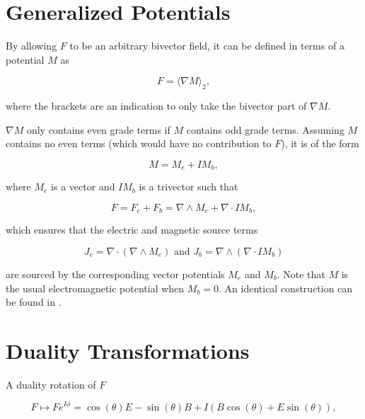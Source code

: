 \documentclass{article}
\begin{document}
  \section{Generalized Potentials}

  By allowing $F$ to be an arbitrary bivector field, it can be defined in terms of a potential $M$ as

  \begin{equation}
    F = \langle \nabla M \rangle_2,
  \end{equation}

  where the brackets are an indication to only take the bivector part of $\nabla M$.

  $\nabla M$ only contains even grade terms if $M$ contains odd grade terms. Assuming $M$ contains no even terms (which would have no contribution to $F$), it is of the form

  \begin{equation}
    M = M_e + I M_b, \label{eq:potential}
  \end{equation}

   where $M_e$ is a vector and $I M_b$ is a trivector such that

  \begin{equation}
    F = F_e + F_b = \nabla \wedge M_e + \nabla \cdot I M_b,
  \end{equation}

  which ensures that the electric and magnetic source terms 

  \begin{equation}
    J_e = \nabla \cdot (\nabla \wedge M_e) \text{ and } J_b = \nabla \wedge (\nabla \cdot I M_b)
  \end{equation} 

  are sourced by the corresponding vector potentials $M_e$ and $M_b$. Note that $M$ is the usual electromagnetic potential when $M_b = 0$. An identical construction can be found in \cite{dressel}.

  \section{Duality Transformations}

  A duality rotation of $F$

  \begin{equation}
    F \mapsto F e^{I \phi} = \cos(\theta) E - \sin(\theta) B + I(B \cos(\theta) + E \sin(\theta)),\label{eq:duality}
  \end{equation}
\end{document}
